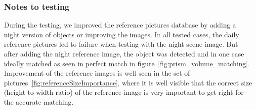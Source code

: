 \documentclass[thesis=B,english]{FITthesis}[2019/12/23]
\begin{document}
                \subsubsection*{Notes to testing}
                During the testing, we improved the reference pictures database by adding a night version of objects or improving the images. In all tested cases, the daily reference pictures led to failure when testing with the night scene image. But after adding the night reference image, the object was detected and in one case ideally matched as seen in perfect match in figure~\ref{fig:prism_volume_matching}. Improvement of the reference images is well seen in the set of pictures~\ref{fig:referenceSizeImportance}, where it is well visible that the correct size (height to width ratio) of the reference image is very important to get right for the accurate matching.
                
\end{document}
